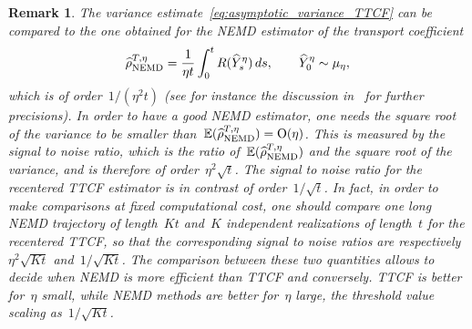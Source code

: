 \documentclass[11pt]{article}
\newcommand{\E}{\mathbb{E}}
\newtheorem{remark}{Remark}
\theoremstyle{definition}
\newcommand{\TestNEMD}{\estTmp^{T,\eta}_{\rm NEMD}}
\newcommand{\estTmp}{\widehat{\rho}}
\begin{document}
\begin{remark}
  \label{rmk:NEMD_vs_TTCF}
  The variance estimate~\eqref{eq:asymptotic_variance_TTCF} can be compared to the one obtained for the NEMD estimator of the transport coefficient
  \[
  \TestNEMD = \frac{1}{\eta t} \int_0^t R(\widehat{Y}_s^\eta) \, ds, \qquad \widehat{Y}_0^\eta \sim \mu_\eta,
  \]
  which is of order~$1/(\eta^2 t)$ (see for instance the discussion in~\cite[Section~3.1]{stoltz2024} for further precisions). In order to have a good NEMD estimator, one needs the square root of the variance to be smaller than~$\E(\TestNEMD) = \mathrm{O}(\eta)$. This is measured by the signal to noise ratio, which is the ratio of~$\E(\TestNEMD)$ and the square root of the variance, and is therefore of order~$\eta^2 \sqrt{t}$. The signal to noise ratio for the recentered TTCF estimator is in contrast of order~$1/\sqrt{t}$. In fact, in order to make comparisons at fixed computational cost, one should compare one long NEMD trajectory of length~$Kt$ and~$K$ independent realizations of length~$t$ for the recentered TTCF, so that the corresponding signal to noise ratios are respectively~$\eta^2 \sqrt{Kt}$ and~$1/\sqrt{Kt}$. The comparison between these two quantities allows to decide when NEMD is more efficient than TTCF and conversely. TTCF is better for~$\eta$ small, while NEMD methods are better for~$\eta$ large, the threshold value scaling as~$1/\sqrt{Kt}$.
\end{remark}


\end{document}
